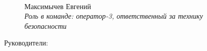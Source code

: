\begin{figure}[H]
\begin{minipage}[h]{0.47\linewidth}
		\\
		Максимычев Евгений\\
		\emph{Роль в команде: оператор-3, ответственный за технику безопасности}
	\end{minipage}
\end{figure}

\newpage

\large Руководители:

